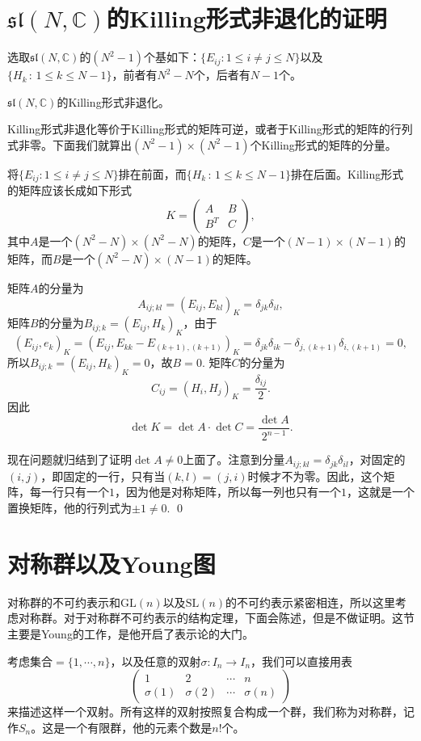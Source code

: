 \documentclass[9pt]{extarticle}
\newcommand{\cc}{\mathbb{C}}
\begin{document}
\clearpage
\section{$\mathfrak{sl}(N,\cc)$的Killing形式非退化的证明}

选取$\mathfrak{sl}(N,\cc)$的$(N^2-1)$个基如下：$\{E_{ij}:1\leq i\neq j \leq N\}$以及$\{H_k\,:\, 1\leq k \leq N-1\}$，前者有$N^2-N$个，后者有$N-1$个。

\pro $\mathfrak{sl}(N,\cc)$的Killing形式非退化。

\proof Killing形式非退化等价于Killing形式的矩阵可逆，或者于Killing形式的矩阵的行列式非零。下面我们就算出$(N^2-1)\times (N^2-1)$个Killing形式的矩阵的分量。

将$\{E_{ij}:1\leq i\neq j \leq N\}$排在前面，而$\{H_k\,:\, 1\leq k \leq N-1\}$排在后面。Killing形式的矩阵应该长成如下形式
\[
K=\begin{pmatrix}
A&B\\
B^T&C
\end{pmatrix},
\]
其中$A$是一个$(N^2-N)\times (N^2-N)$的矩阵，$C$是一个$(N-1)\times (N-1)$的矩阵，而$B$是一个$(N^2-N)\times (N-1)$的矩阵。

矩阵$A$的分量为
\[
	A_{ij;kl}=(E_{ij},E_{kl})_K=\delta_{jk}\delta_{il},
\]
矩阵$B$的分量为$B_{ij;k}=(E_{ij},H_k)_K$，由于
\[
	(E_{ij},e_k)_K=(E_{ij},E_{kk}-E_{(k+1),(k+1)})_K=\delta_{jk}\delta_{ik}-\delta_{j,(k+1)}\delta_{i,(k+1)}=0,
\]
所以$B_{ij;k}=(E_{ij},H_k)_K=0$，故$B=0$. 矩阵$C$的分量为
\[
	C_{ij}=(H_i,H_j)_K=\frac{\delta_{ij}}{2}.
\]
因此
\[
\det K =\det A \cdot \det C = \frac{\det A}{2^{n-1}}.
\]

现在问题就归结到了证明$\det A\neq 0$上面了。注意到分量$A_{ij;kl}=\delta_{jk}\delta_{il}$，对固定的$(i,j)$，即固定的一行，只有当$(k,l)=(j,i)$时候才不为零。因此，这个矩阵，每一行只有一个$1$，因为他是对称矩阵，所以每一列也只有一个$1$，这就是一个置换矩阵，他的行列式为$\pm 1\neq 0$. \qed
\clearpage

\section{对称群以及Young图}

对称群的不可约表示和$\mathrm{GL}(n)$以及$\mathrm{SL}(n)$的不可约表示紧密相连，所以这里考虑对称群。对于对称群不可约表示的结构定理，下面会陈述，但是不做证明。这节主要是Young的工作，是他开启了表示论的大门。

\para 考虑集合$=\{1,\cdots,n\}$，以及任意的双射$\sigma : I_n\to I_n$，我们可以直接用表
\[
	\begin{pmatrix}
	1&2&\cdots &n\\
	\sigma(1)&\sigma(2)&\cdots &\sigma(n)
	\end{pmatrix}
\]
来描述这样一个双射。所有这样的双射按照复合构成一个群，我们称为对称群，记作$S_n$。这是一个有限群，他的元素个数是$n!$个。
\end{document}
